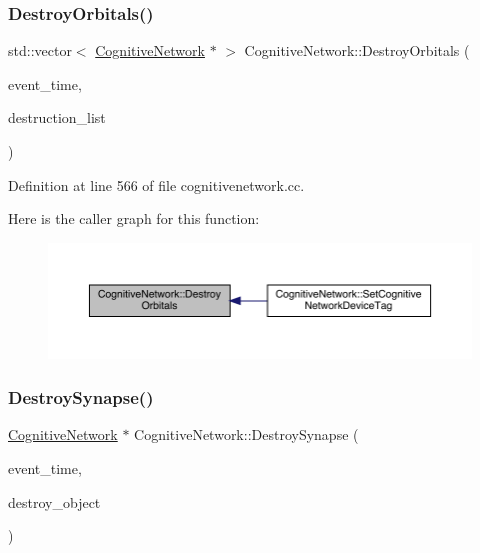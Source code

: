 \subsubsection{\texorpdfstring{Destroy\+Orbitals()}{DestroyOrbitals()}}
{\footnotesize\ttfamily std\+::vector$<$ \hyperlink{class_cognitive_network}{Cognitive\+Network} $\ast$ $>$ Cognitive\+Network\+::\+Destroy\+Orbitals (\begin{DoxyParamCaption}\item[{std\+::chrono\+::time\+\_\+point$<$ \hyperlink{universe_8h_a0ef8d951d1ca5ab3cfaf7ab4c7a6fd80}{Clock} $>$}]{event\+\_\+time,  }\item[{std\+::vector$<$ \hyperlink{class_cognitive_network}{Cognitive\+Network} $\ast$$>$}]{destruction\+\_\+list }\end{DoxyParamCaption})}



Definition at line 566 of file cognitivenetwork.\+cc.

Here is the caller graph for this function\+:
\nopagebreak
\begin{figure}[H]
\begin{center}
\leavevmode
\includegraphics[width=350pt]{class_cognitive_network_a0ee8259d26e30779bf06471fb8a10bb5_icgraph}
\end{center}
\end{figure}
\mbox{\label{class_cognitive_network_a08b87aa9a0823355ef7cef77414dc6dc}} 
\subsubsection{\texorpdfstring{Destroy\+Synapse()}{DestroySynapse()}}
{\footnotesize\ttfamily \hyperlink{class_cognitive_network}{Cognitive\+Network} $\ast$ Cognitive\+Network\+::\+Destroy\+Synapse (\begin{DoxyParamCaption}\item[{std\+::chrono\+::time\+\_\+point$<$ \hyperlink{universe_8h_a0ef8d951d1ca5ab3cfaf7ab4c7a6fd80}{Clock} $>$}]{event\+\_\+time,  }\item[{\hyperlink{class_cognitive_network}{Cognitive\+Network} $\ast$}]{destroy\+\_\+object }\end{DoxyParamCaption})}



